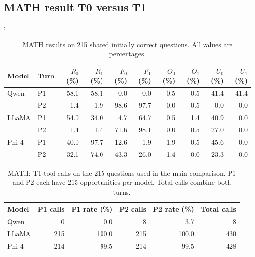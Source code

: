 \documentclass[11pt,a4paper]{article}
\begin{document}
\subsection{MATH result T0 versus T1}:

\begin{table}[htbp]
\centering
\small
\setlength{\tabcolsep}{2.2pt}
\caption{MATH results on 215 shared initially correct
questions. All values are percentages.}
\label{tab:math-results}

\begin{tabular}{@{}llrrrrrrrr@{}}
\toprule
Model & Turn
& $R_0$ (\%) & $R_1$ (\%)
& $F_0$ (\%) & $F_1$ (\%)
& $O_0$ (\%) & $O_1$ (\%)
& $U_0$ (\%) & $U_1$ (\%) \\
\midrule
Qwen & P1
& 58.1 & 58.1 & 0.0 & 0.0
& 0.5 & 0.5 & 41.4 & 41.4 \\
& P2
& 1.4 & 1.9 & 98.6 & 97.7
& 0.0 & 0.5 & 0.0 & 0.0 \\

\addlinespace
LLaMA & P1
& 54.0 & 34.0 & 4.7 & 64.7
& 0.5 & 1.4 & 40.9 & 0.0 \\
& P2
& 1.4 & 1.4 & 71.6 & 98.1
& 0.0 & 0.5 & 27.0 & 0.0 \\

\addlinespace
Phi-4 & P1
& 40.0 & 97.7 & 12.6 & 1.9
& 1.9 & 0.5 & 45.6 & 0.0 \\
& P2
& 32.1 & 74.0 & 43.3 & 26.0
& 1.4 & 0.0 & 23.3 & 0.0 \\
\bottomrule
\end{tabular}
\end{table}


\begin{table}[htbp]
\centering
\small
\caption{MATH: T1 tool calls on the 215 questions used
in the main comparison. P1 and P2 each have 215 opportunities
per model. Total calls combine both turns.}
\label{tab:math-tool-calls}

\begin{tabular}{@{}lrrrrr@{}}
\toprule
Model & P1 calls & P1 rate (\%)
      & P2 calls & P2 rate (\%) & Total calls \\
\midrule
Qwen  & 0   & 0.0   & 8   & 3.7   & 8   \\
LLaMA & 215 & 100.0 & 215 & 100.0 & 430 \\
Phi-4 & 214 & 99.5  & 214 & 99.5  & 428 \\
\bottomrule
\end{tabular}
\end{table}
\end{document}
